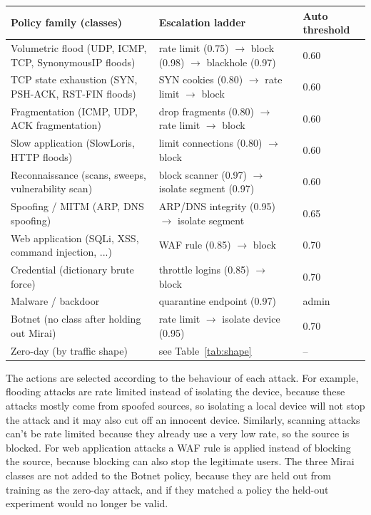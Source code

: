 \documentclass[]{interact}
\theoremstyle{plain}%
\theoremstyle{definition}
\theoremstyle{remark}
\begin{document}
\begin{table}[htbp]
{\small
\begin{tabular}{lll}
\toprule
Policy family (classes) & Escalation ladder & Auto threshold \\
\midrule
Volumetric flood (UDP, ICMP, TCP, SynonymousIP floods) & rate limit (0.75) $\rightarrow$ block (0.98) $\rightarrow$ blackhole (0.97) & 0.60 \\
TCP state exhaustion (SYN, PSH-ACK, RST-FIN floods) & SYN cookies (0.80) $\rightarrow$ rate limit $\rightarrow$ block & 0.60 \\
Fragmentation (ICMP, UDP, ACK fragmentation) & drop fragments (0.80) $\rightarrow$ rate limit $\rightarrow$ block & 0.60 \\
Slow application (SlowLoris, HTTP floods) & limit connections (0.80) $\rightarrow$ block & 0.60 \\
Reconnaissance (scans, sweeps, vulnerability scan) & block scanner (0.97) $\rightarrow$ isolate segment (0.97) & 0.60 \\
Spoofing / MITM (ARP, DNS spoofing) & ARP/DNS integrity (0.95) $\rightarrow$ isolate segment & 0.65 \\
Web application (SQLi, XSS, command injection, ...) & WAF rule (0.85) $\rightarrow$ block & 0.70 \\
Credential (dictionary brute force) & throttle logins (0.85) $\rightarrow$ block & 0.70 \\
Malware / backdoor & quarantine endpoint (0.97) & admin \\
Botnet (no class after holding out Mirai) & rate limit $\rightarrow$ isolate device (0.95) & 0.70 \\
Zero-day (by traffic shape) & see Table~\ref{tab:shape} & -- \\
\bottomrule
\end{tabular}}
\label{tab:playbooks}
\end{table}

The actions are selected according to the behaviour of each attack. For example, flooding attacks are rate limited instead of isolating the device, because these attacks mostly come from spoofed sources, so isolating a local device will not stop the attack and it may also cut off an innocent device. Similarly, scanning attacks can't be rate limited because they already use a very low rate, so the source is blocked. For web application attacks a WAF rule is applied instead of blocking the source, because blocking can also stop the legitimate users. The three Mirai classes are not added to the Botnet policy, because they are held out from training as the zero-day attack, and if they matched a policy the held-out experiment would no longer be valid.
\end{document}
